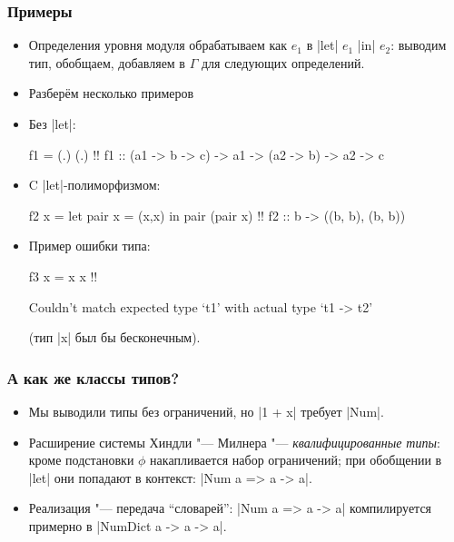 \documentclass[11pt]{beamer}
\begin{document}
\begin{frame}[fragile]
  \frametitle{Примеры}
  \begin{itemize}
    \item Определения уровня модуля обрабатываем как $e_1$ в \haskinline|let| $e_1$ \haskinline|in| $e_2$: выводим тип, обобщаем, добавляем в $\Gamma$ для следующих определений.
          \pause
    \item Разберём несколько примеров
          \pause
    \item Без \haskinline|let|:
          \begin{haskellsmall}
            f1 = (.) (.) !\pause!
            f1 :: (a1 -> b -> c) -> a1 -> (a2 -> b) -> a2 -> c
          \end{haskellsmall}
          \pause
    \item C \haskinline|let|-полиморфизмом:
          \begin{haskellsmall}
            f2 x = let pair x = (x,x) in pair (pair x) !\pause!
            f2 :: b -> ((b, b), (b, b))
          \end{haskellsmall}
          \pause
    \item Пример ошибки типа:
          \begin{haskellsmall}
            f3 x = x x !\pause!
          \end{haskellsmall}
          \begin{ghcismall}
            Couldn't match expected type ‘t1’
                        with actual type ‘t1 -> t2’
          \end{ghcismall}
          (тип \haskinline|x| был бы бесконечным).
  \end{itemize}
\end{frame}

\begin{frame}[fragile]
  \frametitle{А как же классы типов?}
  \begin{itemize}
    \item Мы выводили типы без ограничений, но \haskinline|1 + x| требует \haskinline|Num|.
          \pause
    \item Расширение системы Хиндли "--- Милнера "--- \emph{квалифицированные типы}: кроме подстановки $\phi$ накапливается набор ограничений; при обобщении в \haskinline|let| они попадают в контекст: \haskinline|Num a => a -> a|.
          \pause
    \item Реализация "--- передача \enquote{словарей}: \haskinline|Num a => a -> a| компилируется примерно в \haskinline|NumDict a -> a -> a|.
  \end{itemize}
\end{frame}
\end{document}
